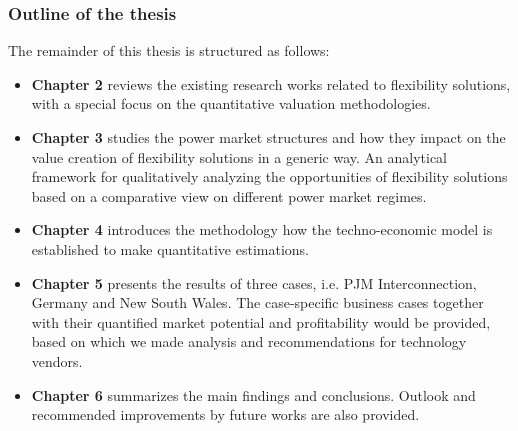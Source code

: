 \subsubsection{Outline of the thesis}

The remainder of this thesis is structured as follows: 

\begin{itemize}
	\item \textbf{Chapter 2} reviews the existing research works related to flexibility solutions, with a special focus on the quantitative valuation methodologies.
	\item \textbf{Chapter 3} studies the power market structures and how they impact on the value creation of flexibility solutions in a generic way. An analytical framework for qualitatively analyzing the opportunities of flexibility solutions based on a comparative view on different power market regimes.
	\item \textbf{Chapter 4} introduces the methodology how the techno-economic model is established to make quantitative estimations.
	\item \textbf{Chapter 5} presents the results of three cases, i.e. PJM Interconnection, Germany and New South Wales. The case-specific business cases together with their quantified market potential and profitability would be provided, based on which we made analysis and recommendations for technology vendors.
	\item \textbf{Chapter 6} summarizes the main findings and conclusions. Outlook and recommended improvements by future works are also provided.
\end{itemize}
